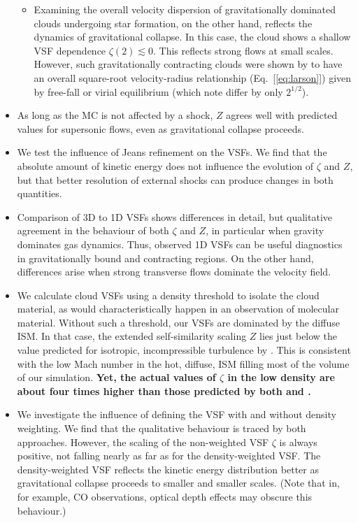\begin{itemize}
\begin{itemize}
        \item Examining the overall velocity dispersion of gravitationally dominated clouds undergoing star formation, on the other hand, reflects the dynamics of gravitational collapse.  In this case, the cloud shows a shallow VSF dependence $\zeta(2) \lesssim 0$. This reflects strong flows at small scales. However, such gravitationally contracting clouds were shown by  to have an overall square-root velocity-radius relationship (Eq.~[\ref{eq:larson}]) given by free-fall or virial equilibrium (which \citealt{Ballesteros2011} note differ by only $2^{1/2}$).
    \end{itemize}
	\item As long as the MC is not affected by a shock, $Z$ agrees well with predicted values for supersonic flows, even as gravitational collapse proceeds.
	\item We test the influence of Jeans refinement on the VSFs. We find that the absolute amount of kinetic energy does not influence the evolution of $\zeta$ and $Z$, but that better resolution of external shocks can produce changes in both quantities.
	\item Comparison of 3D to 1D VSFs shows differences in detail, but qualitative agreement in the behaviour of both $\zeta$ and $Z$, in particular when gravity dominates gas dynamics. Thus, observed 1D VSFs can be useful diagnostics in gravitationally bound and contracting regions. On the other hand, differences arise when strong transverse flows dominate the velocity field. 
	\item We calculate cloud VSFs using a density threshold to isolate the cloud material, as would characteristically happen in an observation of molecular material. Without such a threshold, our VSFs are dominated by the diffuse ISM. In that case, the extended self-similarity scaling $Z$ lies just below the value predicted for isotropic, incompressible turbulence by \citet{She1994}. This is consistent with the low Mach number in the hot, diffuse, ISM filling most of the volume of our simulation.
	\textbf{
	Yet, the actual values of $\zeta$ in the low density are about four times higher than those predicted by both \citet{She1994} and \citet{Boldyrev2002}.
	}
	\item We investigate the influence of defining the VSF with and without density weighting. We find that the qualitative behaviour is traced by both approaches. However, the scaling of the non-weighted VSF $\zeta$ is always positive, not falling nearly as far as for the density-weighted VSF. The density-weighted VSF reflects the kinetic energy distribution better as gravitational collapse proceeds to smaller and smaller scales. (Note that in, for example, CO observations, optical depth effects may obscure this behaviour.) 

\end{itemize}

